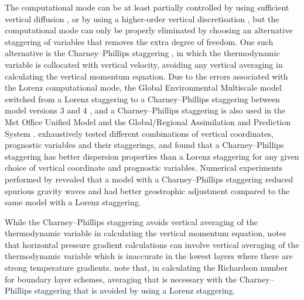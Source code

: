The computational mode can be at least partially controlled by using sufficient vertical diffusion \citep{chang1992,zadra2004}, or by using a higher-order vertical discretisation \citep{untch-hortal2004,guerra-ullrich2016,yi-park2017}, but the computational mode can only be properly eliminated by choosing an alternative staggering of variables that removes the extra degree of freedom.
One such alternative is the Charney--Phillips staggering \citep{charney-phillips1953}, in which the thermodynamic variable is collocated with vertical velocity, avoiding any vertical averaging in calculating the vertical momentum equation.
Due to the errors associated with the Lorenz computational mode, the Global Environmental Multiscale model switched from a Lorenz staggering to a Charney--Phillips staggering between model versions 3 and 4 \citep{girard2014}, and a Charney--Phillips staggering is also used in the Met Office Unified Model \citep{davies2005} and the Global/Regional Assimilation and Prediction System \citep{yang2007}.
\citet{thuburn-woolings2005} exhaustively tested different combinations of vertical coordinates, prognostic variables and their staggerings, and found that a Charney--Phillips staggering has better dispersion properties than a Lorenz staggering for any given choice of vertical coordinate and prognostic variables.
Numerical experiments performed by \citet{cullen1997} revealed that a model with a Charney--Phillips staggering reduced spurious gravity waves and had better geostrophic adjustment compared to the same model with a Lorenz staggering.

While the Charney--Phillips staggering avoids vertical averaging of the thermodynamic variable in calculating the vertical momentum equation, \citet{davies2005} notes that horizontal pressure gradient calculations can involve vertical averaging of the thermodynamic variable which is inaccurate in the lowest layers where there are strong temperature gradients.
\citet{holdaway2013a} note that, in calculating the Richardson number for boundary layer schemes, averaging that is necessary with the Charney--Phillips staggering that is avoided by using a Lorenz staggering.


